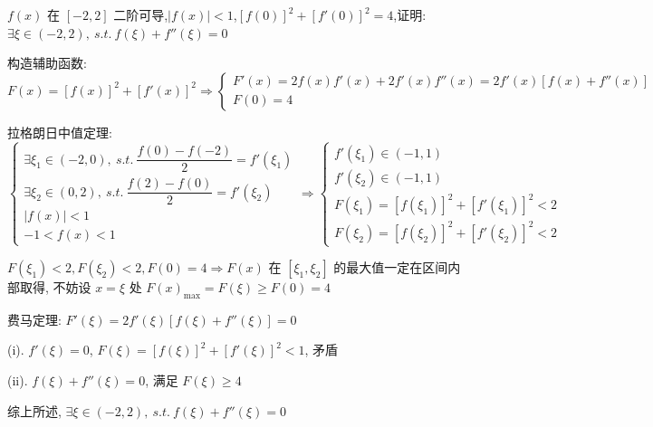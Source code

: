 \begin{proposition}
	$f(x)$ 在 $[-2,2]$ 二阶可导,$|f(x)|<1$,$[f(0)]^{2}+[f'(0)]^{2}=4$,证明: $\exists \xi\in(-2,2),\ s.t.\ f(\xi)+f''(\xi)=0$
\end{proposition}
\begin{solution}

	构造辅助函数: 
	$$F(x)=[f(x)]^{2}+[f'(x)]^{2}\Rightarrow \begin{cases}
		F'(x) = 2f(x)f'(x)+2f'(x)f''(x) = 2f'(x)\left[f(x)+f''(x)\right]\\
		F(0) = 4
	\end{cases}$$

	拉格朗日中值定理:
	$$\begin{cases}
		\exists \xi_{1}\in(-2,0),\ s.t.\ \dfrac{f(0)-f(-2)}{2} = f'(\xi_{1})\\
		\exists \xi_{2}\in(0,2),\ s.t.\ \dfrac{f(2)-f(0)}{2} = f'(\xi_{2})\\
		|f(x)| < 1\\
		-1 < f(x) < 1
	\end{cases}\Rightarrow 
	\begin{cases}
		f'(\xi_{1})\in (-1,1)\\
		f'(\xi_{2})\in(-1,1)\\
		F(\xi_{1}) = [f(\xi_{1})]^{2}+[f'(\xi_{1})]^{2} < 2\\
		F(\xi_{2}) = [f(\xi_{2})]^{2}+[f'(\xi_{2})]^{2} < 2
	\end{cases}$$

	$F(\xi_{1}) < 2, F(\xi_{2}) < 2, F(0) = 4\Rightarrow F(x)$ 在 $[\xi_{1},\xi_{2}]$ 的最大值一定在区间内部取得,
	不妨设 $x=\xi$ 处 $F(x)_{\max} = F(\xi) \geq F(0) = 4$

	费马定理: $F'(\xi) = 2f'(\xi)\left[f(\xi)+f''(\xi)\right] = 0$

	(i). $f'(\xi) = 0$, $F(\xi) = [f(\xi)]^{2}+[f'(\xi)]^{2} < 1$, 矛盾

	(ii). $f(\xi)+f''(\xi) = 0$, 满足 $F(\xi) \geq 4$

	综上所述, $\exists \xi\in(-2,2),\ s.t.\ f(\xi)+f''(\xi)=0$
\end{solution}

